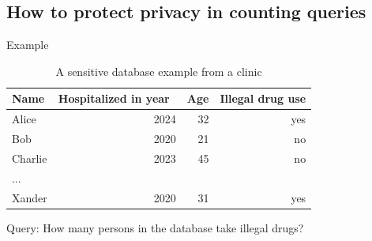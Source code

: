 \documentclass[12pt,aspectratio=169,handout]{beamer}
\begin{document}
\subsection{How to protect privacy in counting queries}


\begin{frame}{Example}

\begin{table}
\footnotesize
\begin{tabular}{lrrr} \toprule
Name & Hospitalized in year & Age & Illegal drug use \\ \midrule
Alice & 2024 & 32 & yes \\
Bob & 2020 & 21 & no \\
Charlie & 2023 & 45 & no \\
$\ldots$ & & & \\
Xander & 2020 & 31 & yes \\ \bottomrule
\end{tabular}
\caption{A sensitive database example from a clinic}
\end{table}

Query: How many persons in the database take illegal drugs?




\end{frame}
\end{document}
